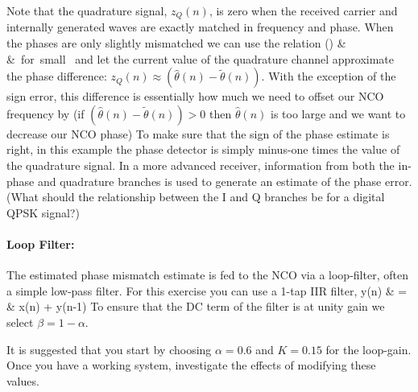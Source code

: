 Note that the quadrature signal, $z_Q(n)$, is zero
when the received carrier and internally generated 
waves are exactly matched in frequency and phase.  When the phases 
are only slightly mismatched we can use the relation
\bea
\sin(\theta) \approx \theta & &\mbox{ for small } \theta \nonumber
\eea
and let the current value of the quadrature channel approximate the
phase difference: $z_Q(n) \approx (\hat{\theta}(n) - \tilde{\theta}(n))$.
With the exception of the sign error, this difference is essentially how 
much we need to offset our NCO frequency by 
(if $(\hat{\theta}(n) - \tilde{\theta}(n)) >0$
then $\hat{\theta}(n)$ is too large and we want to decrease our NCO
phase)
To make sure that the sign of the phase estimate is right,
in this example the phase detector is simply minus-one times
the value of the quadrature signal.  
In a more advanced receiver, information from both the in-phase
and quadrature branches is used to generate an estimate of
the phase error.  (What should the relationship between the I and Q
branches be for a digital QPSK signal?)

\paragraph{Loop Filter:}

The estimated phase mismatch estimate is fed to the NCO via a loop-filter,
often a simple low-pass filter. For this exercise you can use a 1-tap 
IIR filter,
\bea
y(n) & = & \beta x(n) + \alpha y(n-1)
\eea
To ensure that the DC term of the filter is at unity gain we select
$\beta = 1 - \alpha$.

It is suggested that you start by choosing $\alpha = 0.6$ and $K = 0.15$ 
for the loop-gain.  Once you have a working system, investigate
the effects of modifying these values.

